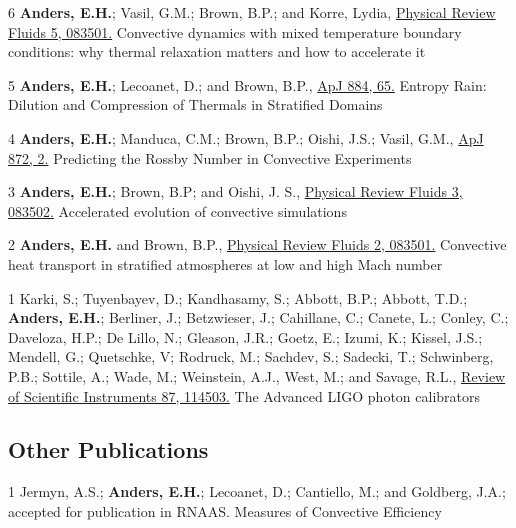 	  {6}
	  {
		  \textbf{Anders, E.H.}; Vasil, G.M.; Brown, B.P.; and Korre, Lydia, 
		  \href{https://journals.aps.org/prfluids/abstract/10.1103/PhysRevFluids.5.083501}{Physical Review Fluids 5, 083501.}
	  }
	  {Convective dynamics with mixed temperature boundary conditions: why thermal relaxation matters and how to accelerate it}

	  {5}
	  {
		  \textbf{Anders, E.H.}; Lecoanet, D.; and Brown, B.P., 
		  \href{https://iopscience.iop.org/article/10.3847/1538-4357/ab3644}{ApJ 884, 65.}
	  }
	  {Entropy Rain: Dilution and Compression of Thermals in Stratified Domains}

\cvpub{}
	  {4}
	  {
		  \textbf{Anders, E.H.}; Manduca, C.M.; Brown, B.P.; Oishi, J.S.; Vasil, G.M., 
		  \href{https://iopscience.iop.org/article/10.3847/1538-4357/aaff61}{ApJ 872, 2.}
	  }
	  {Predicting the Rossby Number in Convective Experiments}

	  {3}
	  {
		  \textbf{Anders, E.H.}; Brown, B.P; and Oishi, J. S.,
		  \href{https://journals.aps.org/prfluids/abstract/10.1103/PhysRevFluids.3.083502}{Physical Review Fluids 3, 083502.}
	  }
	  {Accelerated evolution of convective simulations}

	  {2}
	  {
		  \textbf{Anders, E.H.} and Brown, B.P.,
		  \href{https://journals.aps.org/prfluids/abstract/10.1103/PhysRevFluids.2.083501}{Physical Review Fluids 2, 083501.}
	  }
	  {Convective heat transport in stratified atmospheres at low and high Mach number}

	  {1}
	  {
			Karki, S.; Tuyenbayev, D.; Kandhasamy, S.; Abbott, B.P.; Abbott, T.D.; \textbf{Anders, E.H.};
			Berliner, J.; Betzwieser, J.; Cahillane, C.; Canete, L.; Conley, C.; Daveloza, H.P.; De Lillo, N.;
			Gleason, J.R.; Goetz, E.; Izumi, K.; Kissel, J.S.; Mendell, G.; Quetschke, V; Rodruck, M.; Sachdev, S.;
			Sadecki, T.; Schwinberg, P.B.; Sottile, A.; Wade, M.; Weinstein, A.J., West, M.; and Savage, R.L.,
			\href{https://aip.scitation.org/doi/10.1063/1.4967303}{Review of Scientific Instruments 87, 114503.}
	  }
	  {The Advanced LIGO photon calibrators}


\subsection{Other Publications}

	  {1}
	  {
		Jermyn, A.S.; \textbf{Anders, E.H.}; Lecoanet, D.; Cantiello, M.; and Goldberg, J.A.; accepted for publication in RNAAS.
	  }
	  {Measures of Convective Efficiency}



